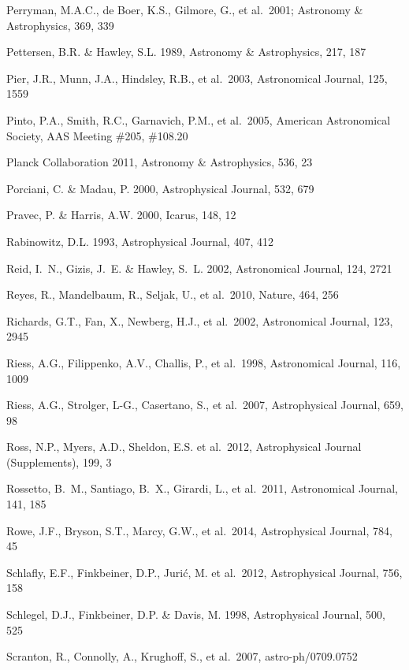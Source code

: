 \documentclass{emulateapj}
\begin{document}
\begin{thebibliography}{}
\bibitem[()]{} Perryman, M.A.C., de Boer, K.S., Gilmore, G., et al.~2001; Astronomy \&
             Astrophysics, 369, 339

\bibitem[()]{} Pettersen, B.R. \& Hawley, S.L. 1989, Astronomy \& Astrophysics, 217, 187

\bibitem[()]{} Pier, J.R., Munn, J.A., Hindsley, R.B., et al.~2003, Astronomical Journal, 125, 1559

\bibitem[()]{} Pinto, P.A., Smith, R.C., Garnavich, P.M., et al.~2005,
              American Astronomical Society, AAS Meeting \#205, \#108.20

\bibitem[()]{} Planck Collaboration 2011,  Astronomy \& Astrophysics, 536, 23

\bibitem[()]{} Porciani, C. \& Madau, P. 2000, Astrophysical Journal, 532, 679

\bibitem[()]{} Pravec, P. \& Harris, A.W. 2000, Icarus, 148, 12

\bibitem[()]{} Rabinowitz, D.L. 1993,  Astrophysical Journal, 407, 412

\bibitem[()]{} Reid, I.~N., Gizis, J.~E. \& Hawley, S.~L. 2002,  Astronomical Journal, 124, 2721

\bibitem[()]{} Reyes, R., Mandelbaum, R., Seljak, U., et al.~2010, Nature, 464, 256

\bibitem[()]{} Richards, G.T., Fan, X., Newberg, H.J., et al.~2002, Astronomical Journal, 123, 2945

\bibitem[()]{} Riess, A.G., Filippenko, A.V., Challis, P., et al.~1998, Astronomical Journal, 116, 1009

\bibitem[()]{} Riess, A.G., Strolger, L-G., Casertano, S., et al.~2007, Astrophysical Journal, 659, 98

\bibitem[()]{} Ross, N.P., Myers, A.D., Sheldon, E.S. et al.~2012,
  Astrophysical Journal (Supplements), 199, 3

\bibitem[()]{} Rossetto, B.~M., Santiago, B.~X., Girardi, L., et al.~2011, Astronomical Journal, 141, 185

\bibitem[()]{} Rowe, J.F., Bryson, S.T., Marcy, G.W., et al.~2014, Astrophysical Journal, 784, 45

\bibitem[()]{} Schlafly, E.F., Finkbeiner, D.P., Juri\'c, M. et
  al.~2012, Astrophysical Journal, 756, 158

\bibitem[()]{} Schlegel, D.J., Finkbeiner, D.P. \& Davis, M. 1998, Astrophysical Journal, 500, 525

\bibitem[()]{} Scranton, R., Connolly, A., Krughoff, S., et al.~2007, astro-ph/0709.0752


\end{thebibliography}
\end{document}
